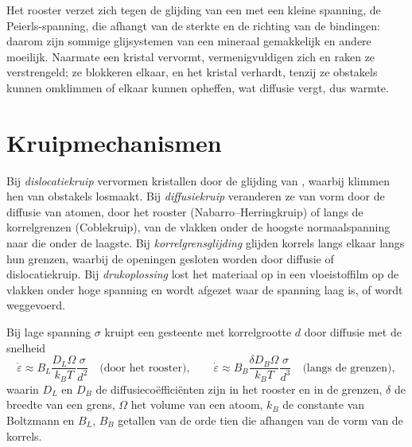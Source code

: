 Het rooster verzet zich tegen de glijding van een  met een kleine spanning, de
Peierls-spanning, die afhangt van de sterkte en de richting van de bindingen:
daarom zijn sommige glijsystemen van een mineraal gemakkelijk en andere moeilijk. Naarmate
een kristal vervormt, vermenigvuldigen  zich en raken ze verstrengeld; ze blokkeren elkaar, en
het kristal verhardt, tenzij ze obstakels kunnen omklimmen of elkaar kunnen opheffen, wat
diffusie vergt, dus warmte.

\section{Kruipmechanismen}

\begin{definition}[Kruipmechanismen]\label{def:b3:deformation-mechanisms:creep}
Bij \emph{dislocatiekruip} vervormen kristallen door de
glijding van , waarbij klimmen hen van obstakels losmaakt. Bij
\emph{diffusiekruip} veranderen ze van vorm door de
diffusie van atomen, door het rooster (Nabarro--Herringkruip) of langs de
korrelgrenzen (Coblekruip), van de vlakken onder de hoogste normaalspanning
naar die onder de laagste. Bij \emph{korrelgrensglijding}
glijden korrels langs elkaar langs hun grenzen, waarbij de openingen
gesloten worden door diffusie of dislocatiekruip. Bij \emph{drukoplossing
} lost het materiaal op in een vloeistoffilm op de
vlakken onder hoge spanning en wordt afgezet waar de spanning laag is, of
wordt weggevoerd.
\end{definition}

\begin{proposition}\label{prop:b3:deformation-mechanisms:grain-size}
Bij lage spanning $\sigma$ kruipt een gesteente met korrelgrootte $d$ door diffusie met de snelheid
\[
  \dot\varepsilon \approx B_L\frac{D_L\Omega}{k_BT}\frac{\sigma}{d^2}
  \quad\text{(door het rooster)},\qquad
  \dot\varepsilon \approx B_B\frac{\delta D_B\Omega}{k_BT}\frac{\sigma}{d^3}
  \quad\text{(langs de grenzen)},
\]
waarin $D_L$ en $D_B$ de diffusiecoëfficiënten zijn in het rooster en in de
grenzen, $\delta$ de breedte van een grens, $\Omega$ het volume van een atoom,
$k_B$ de constante van Boltzmann en $B_L$, $B_B$ getallen van de orde tien die afhangen van
de vorm van de korrels.
\end{proposition}

